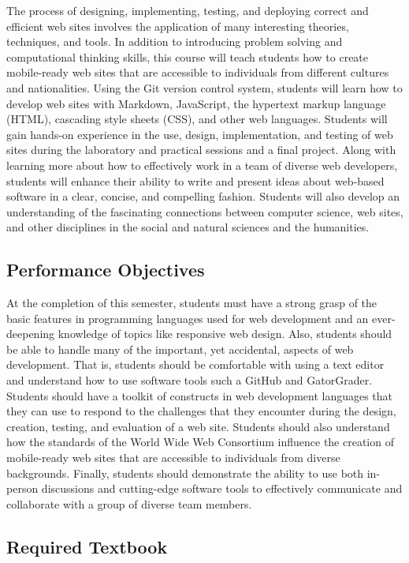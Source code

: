 \documentclass[11pt]{article}
\begin{document}
The process of designing, implementing, testing, and deploying correct and efficient web sites involves the application
of many interesting theories, techniques, and tools. In addition to introducing problem solving and computational
thinking skills, this course will teach students how to create mobile-ready web sites that are accessible to individuals
from different cultures and nationalities. Using the Git version control system, students will learn how to develop web
sites with Markdown, JavaScript, the hypertext markup language (HTML), cascading style sheets (CSS), and other web
languages. Students will gain hands-on experience in the use, design, implementation, and testing of web sites during
the laboratory and practical sessions and a final project. Along with learning more about how to effectively work in a
team of diverse web developers, students will enhance their ability to write and present ideas about web-based software
in a clear, concise, and compelling fashion. Students will also develop an understanding of the fascinating connections
between computer science, web sites, and other disciplines in the social and natural sciences and the humanities.

\subsection*{Performance Objectives}

At the completion of this semester, students must have a strong grasp of the basic features in programming languages
used for web development and an ever-deepening knowledge of topics like responsive web design. Also, students should be
able to handle many of the important, yet accidental, aspects of web development. That is, students should be
comfortable with using a text editor and understand how to use software tools such a GitHub and GatorGrader. Students
should have a toolkit of constructs in web development languages that they can use to respond to the challenges that
they encounter during the design, creation, testing, and evaluation of a web site. Students should also understand how
the standards of the World Wide Web Consortium influence the creation of mobile-ready web sites that are accessible to
individuals from diverse backgrounds. Finally, students should demonstrate the ability to use both in-person discussions
and cutting-edge software tools to effectively communicate and collaborate with a group of diverse team members.

\subsection*{Required Textbook}
\end{document}
